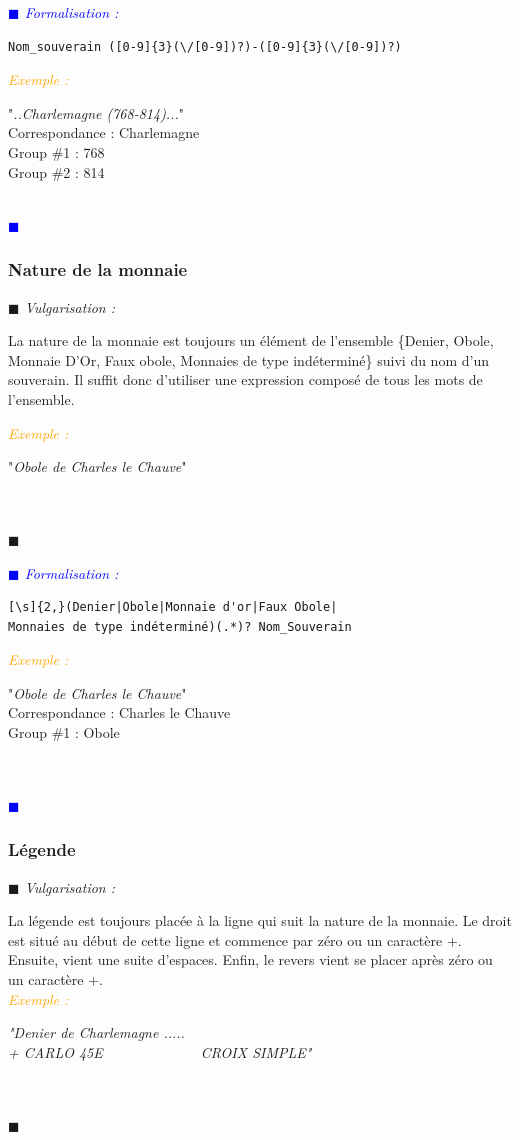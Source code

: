\documentclass[a4paper, 11pt]{report}
\newenvironment{vulgarisation}
    {
    \textit{\textcolor{dark-blue}{$\blacksquare$  Vulgarisation : \\}}

    }
    {
    ~\\\textcolor{dark-blue}{$\blacksquare$}\\
    }
\newenvironment{formalisation}
    {
    \textit{\textcolor{blue}{$\blacksquare$  Formalisation : \\}}
    }
    {
    ~\\\textcolor{blue}{$\blacksquare$}\\
    }
\newenvironment{exemple}
    {
    \textit{\textcolor{orange}{
    Exemple : \\}}
    }
    {\\
    }
\begin{document}
\begin{formalisation}
	\begin{verbatim}
Nom_souverain ([0-9]{3}(\/[0-9])?)-([0-9]{3}(\/[0-9])?)
	\end{verbatim}
	\begin{exemple}
		"\emph{..Charlemagne (768-814)...}" \\
		Correspondance : Charlemagne \\
		Group \#1 : 768 \\
		Group \#2 : 814
	\end{exemple}
\end{formalisation}

\subsubsection{Nature de la monnaie}
\begin{vulgarisation}
	La nature de la monnaie est toujours un élément de l'ensemble \{Denier, Obole, Monnaie D'Or, Faux obole, Monnaies de type indéterminé\} suivi du nom d'un souverain. Il suffit donc d'utiliser une expression composé de tous les mots de l'ensemble.
	
	\begin{exemple}
		"\emph{Obole de Charles le Chauve}" \\
	\end{exemple}
\end{vulgarisation}

\begin{formalisation}
	\begin{verbatim}
[\s]{2,}(Denier|Obole|Monnaie d'or|Faux Obole|
Monnaies de type indéterminé)(.*)? Nom_Souverain
	\end{verbatim}
	\begin{exemple}
		"\emph{Obole de Charles le Chauve}" \\
		Correspondance : Charles le Chauve \\
		Group \#1 : Obole \\
	\end{exemple}
\end{formalisation}

\subsubsection{Légende}
\begin{vulgarisation}
	La légende est toujours placée à la ligne qui suit la nature de la monnaie. Le droit est situé au début de cette ligne et commence par zéro ou un caractère +. Ensuite, vient une suite d'espaces. Enfin, le revers vient se placer après zéro ou un caractère +.\\
	\begin{exemple}
		\emph{"Denier de Charlemagne ..... \\+ CARLO  45E~~~~~~~~~~~~~ CROIX SIMPLE"}\\
	\end{exemple}
\end{vulgarisation}
\end{document}
